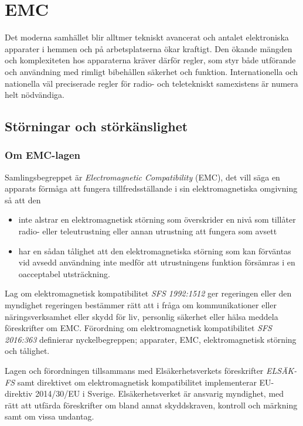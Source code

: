 \chapter{EMC}
\label{EMC}

Det moderna samhället blir alltmer tekniskt avancerat och antalet elektroniska
apparater i hemmen och på arbetsplatserna ökar kraftigt.
Den ökande mängden och komplexiteten hos apparaterna kräver därför regler, som
styr både utförande och användning med rimligt bibehållen säkerhet och funktion.
Internationella och nationella väl preciserade regler för radio- och
teletekniskt samexistens är numera helt nödvändiga.

\section{Störningar och störkänslighet}

\subsection{Om EMC-lagen}
\label{EMC-lagen}

Samlingsbegreppet är \emph{Electromagnetic Compatibility} (EMC), det vill säga
en apparats förmåga att fungera tillfredsställande i sin elektromagnetiska
omgivning så att den
\begin{itemize}
	\item inte alstrar en elektromagnetisk störning som överskrider en nivå som
	tillåter radio- eller teleutrustning eller annan utrustning att fungera som
	avsett
	\item har en sådan tålighet att den elektromagnetiska störning som kan
	förväntas vid avsedd användning inte medför att utrustningens funktion
	försämras i en oacceptabel utsträckning.
\end{itemize}

Lag om elektromagnetisk kompatibilitet \emph{SFS 1992:1512} \cite{SFS1992:1512}
ger regeringen eller den myndighet regeringen bestämmer rätt att i fråga om
kommunikationer eller näringsverksamhet eller skydd för liv, personlig säkerhet
eller hälsa meddela föreskrifter om EMC.
Förordning om elektromagnetisk kompatibilitet \emph{SFS 2016:363}
\cite{SFS2016:363} definierar nyckelbegreppen; apparater, EMC, elektromagnetisk
störning och tålighet.

Lagen och förordningen tillsammans med Elsäkerhetsverkets föreskrifter
\emph{ELSÄK-FS} samt direktivet om elektromagnetisk kompatibilitet implementerar
EU-direktiv 2014/30/EU i Sverige.
Elsäkerhetsverket är ansvarig myndighet, med rätt att utfärda föreskrifter om
bland annat skyddskraven, kontroll och märkning samt om vissa undantag.

